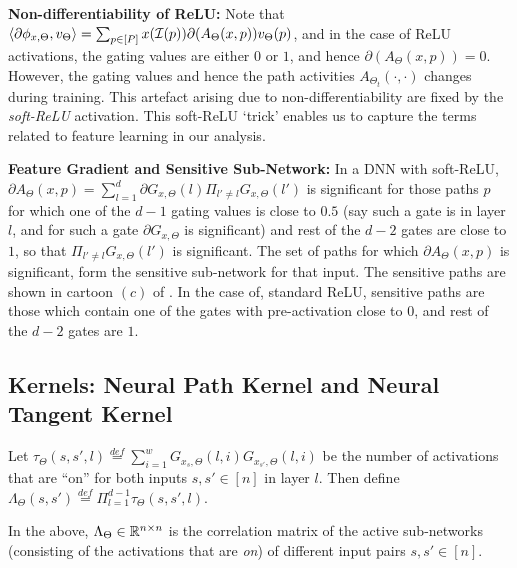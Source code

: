 \textbf{Non-differentiability of ReLU:} Note that $\langle \partial\phi_{x,\Theta},v_{\Theta}\rangle=\sum_{p\in [P]}x(\mathcal{I}(p)) \partial(A_{\Theta}(x,p)) v_{\Theta}(p)$, and in the case of ReLU activations, the gating values are either $0$ or $1$, and hence $\partial(A_{\Theta}(x,p))=0$. However, the gating values and hence the path activities $A_{\Theta_t}(\cdot,\cdot)$ changes during training. This artefact arising due to non-differentiability are fixed by the \emph{soft-ReLU} activation. This soft-ReLU `trick' enables us to capture the terms related to feature learning in our analysis. %

\textbf{Feature Gradient and Sensitive Sub-Network:} In a DNN with soft-ReLU, $\partial A_{\Theta}(x,p)=\sum_{l=1}^d \partial G_{x,\Theta}(l)\Pi_{l'\neq l}G_{x,\Theta}(l')$ is significant for those paths $p$ for which one of the $d-1$ gating values is close to $0.5$ (say such a gate is in layer $l$, and for such a gate $\partial G_{x,\Theta}$ is significant) and rest of the $d-2$ gates are close to $1$, so that $\Pi_{l'\neq l}G_{x,\Theta}(l')$ is significant. The set of paths for which $\partial A_{\Theta}(x,p)$ is significant, form the sensitive sub-network for that input. The sensitive paths are shown in cartoon $(c)$ of . In the case of, standard ReLU, sensitive paths are those which contain one of the gates with pre-activation close to $0$, and rest of the $d-2$ gates are $1$.
\subsection{Kernels: Neural Path Kernel and Neural Tangent Kernel}\label{sec:ker}
\begin{definition}\label{def:lambda}
Let $\tau_{\Theta}(s,s',l)\stackrel{def}=\sum_{i=1}^w G_{x_s,\Theta}(l,i)G_{x_{s'},\Theta}(l,i)$ be the number of activations that are ``on'' for both inputs $s,s'\in[n]$ in layer $l$. Then define $\Lambda_{\Theta}(s,s')\stackrel{def}=\Pi_{l=1}^{d-1}\tau_{\Theta}(s,s',l)$.
\end{definition}
In the  above, $\Lambda_{\Theta}\in\mathbb{R}^{n\times n}$ is the correlation matrix of the active sub-networks (consisting of the activations that are \emph{on}) of different input pairs $s,s'\in[n]$. %

